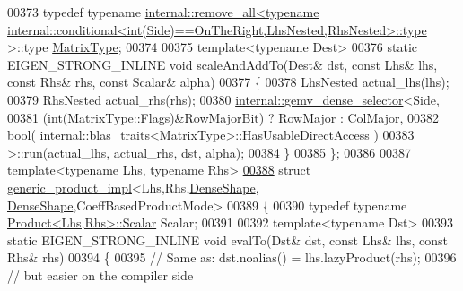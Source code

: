 \begin{DoxyCode}
00373   \textcolor{keyword}{typedef} \textcolor{keyword}{typename} 
      \hyperlink{struct_eigen_1_1internal_1_1remove__all}{internal::remove\_all<typename internal::conditional<int(Side)==OnTheRight,LhsNested,RhsNested>::type}
      >::type \hyperlink{group___sparse_core___module}{MatrixType};
00374 
00375   \textcolor{keyword}{template}<\textcolor{keyword}{typename} Dest>
00376   \textcolor{keyword}{static} EIGEN\_STRONG\_INLINE \textcolor{keywordtype}{void} scaleAndAddTo(Dest& dst, \textcolor{keyword}{const} Lhs& lhs, \textcolor{keyword}{const} Rhs& rhs, \textcolor{keyword}{const} Scalar& 
      alpha)
00377   \{
00378     LhsNested actual\_lhs(lhs);
00379     RhsNested actual\_rhs(rhs);
00380     \hyperlink{struct_eigen_1_1internal_1_1gemv__dense__selector}{internal::gemv\_dense\_selector}<Side,
00381                             (int(MatrixType::Flags)&\hyperlink{group__flags_gae4f56c2a60bbe4bd2e44c5b19cbe8762}{RowMajorBit}) ? 
      \hyperlink{group__enums_ggaacded1a18ae58b0f554751f6cdf9eb13acfcde9cd8677c5f7caf6bd603666aae3}{RowMajor} : \hyperlink{group__enums_ggaacded1a18ae58b0f554751f6cdf9eb13a0cbd4bdd0abcfc0224c5fcb5e4f6669a}{ColMajor},
00382                             \textcolor{keywordtype}{bool}(
      \hyperlink{struct_eigen_1_1internal_1_1blas__traits}{internal::blas\_traits<MatrixType>::HasUsableDirectAccess}
      )
00383                            >::run(actual\_lhs, actual\_rhs, dst, alpha);
00384   \}
00385 \};
00386 
00387 \textcolor{keyword}{template}<\textcolor{keyword}{typename} Lhs, \textcolor{keyword}{typename} Rhs>
\hyperlink{struct_eigen_1_1internal_1_1generic__product__impl_3_01_lhs_00_01_rhs_00_01_dense_shape_00_01_de59d3ba8d1712b00b0be8f7c4d1d76ce2}{00388} \textcolor{keyword}{struct }\hyperlink{struct_eigen_1_1internal_1_1generic__product__impl}{generic\_product\_impl}<Lhs,Rhs,\hyperlink{struct_eigen_1_1_dense_shape}{DenseShape},
      \hyperlink{struct_eigen_1_1_dense_shape}{DenseShape},CoeffBasedProductMode> 
00389 \{
00390   \textcolor{keyword}{typedef} \textcolor{keyword}{typename} \hyperlink{group___core___module_class_eigen_1_1_product}{Product<Lhs,Rhs>::Scalar} Scalar;
00391   
00392   \textcolor{keyword}{template}<\textcolor{keyword}{typename} Dst>
00393   \textcolor{keyword}{static} EIGEN\_STRONG\_INLINE \textcolor{keywordtype}{void} evalTo(Dst& dst, \textcolor{keyword}{const} Lhs& lhs, \textcolor{keyword}{const} Rhs& rhs)
00394   \{
00395     \textcolor{comment}{// Same as: dst.noalias() = lhs.lazyProduct(rhs);}
00396     \textcolor{comment}{// but easier on the compiler side}

\end{DoxyCode}
